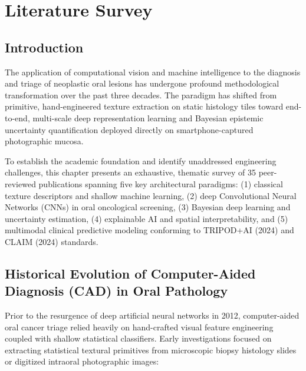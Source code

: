 \documentclass[12pt,a4paper,oneside]{report}
\begin{document}
\chapter{Literature Survey}
\label{ch:literature_survey}

\section{Introduction}
\label{sec:lit_intro}

The application of computational vision and machine intelligence to the diagnosis and triage of neoplastic oral lesions has undergone profound methodological transformation over the past three decades. The paradigm has shifted from primitive, hand-engineered texture extraction on static histology tiles toward end-to-end, multi-scale deep representation learning and Bayesian epistemic uncertainty quantification deployed directly on smartphone-captured photographic mucosa. 

To establish the academic foundation and identify unaddressed engineering challenges, this chapter presents an exhaustive, thematic survey of 35 peer-reviewed publications spanning five key architectural paradigms: (1) classical texture descriptors and shallow machine learning, (2) deep Convolutional Neural Networks (CNNs) in oral oncological screening, (3) Bayesian deep learning and uncertainty estimation, (4) explainable AI and spatial interpretability, and (5) multimodal clinical predictive modeling conforming to TRIPOD+AI (2024) and CLAIM (2024) standards.

\section{Historical Evolution of Computer-Aided Diagnosis (CAD) in Oral Pathology}
\label{sec:cad_history}

Prior to the resurgence of deep artificial neural networks in 2012, computer-aided oral cancer triage relied heavily on hand-crafted visual feature engineering coupled with shallow statistical classifiers. Early investigations focused on extracting statistical textural primitives from microscopic biopsy histology slides or digitized intraoral photographic images:
\end{document}
